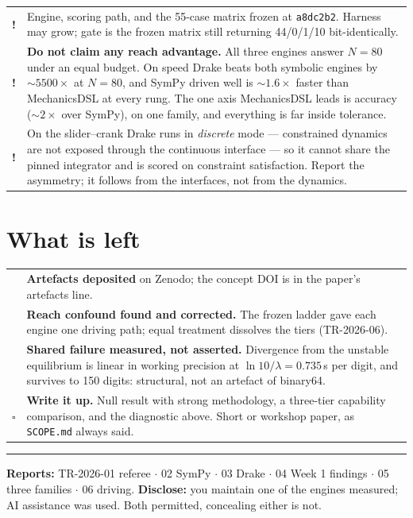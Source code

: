 \documentclass[10pt,a4paper]{article}
\newcommand{\done}{\textcolor{okgreen}{\textbf{\checkmark}}}
\newcommand{\todo}{\textcolor{nextblue}{$\square$}}
\begin{document}
\begin{tabular}{@{}cL{0.90\textwidth}@{}}
\textcolor{holdred}{\textbf{!}} & Engine, scoring path, and the 55-case matrix frozen at \texttt{a8dc2b2}. Harness may grow; gate is the frozen matrix still returning 44/0/1/10 bit-identically. \\
\textcolor{holdred}{\textbf{!}} & \textbf{Do not claim any reach advantage.} All three engines answer $N=80$ under an equal budget. On speed Drake beats both symbolic engines by ${\sim}5500\times$ at $N=80$, and SymPy driven well is ${\sim}1.6\times$ faster than MechanicsDSL at every rung. The one axis MechanicsDSL leads is accuracy (${\sim}2\times$ over SymPy), on one family, and everything is far inside tolerance. \\
\textcolor{holdred}{\textbf{!}} & On the slider--crank Drake runs in \emph{discrete} mode --- constrained dynamics are not exposed through the continuous interface --- so it cannot share the pinned integrator and is scored on constraint satisfaction. Report the asymmetry; it follows from the interfaces, not from the dynamics. \\
\end{tabular}

\section{What is left}

\begin{tabular}{@{}cL{0.90\textwidth}@{}}
\done & \textbf{Artefacts deposited} on Zenodo; the concept DOI is in the paper's artefacts line. \\
\done & \textbf{Reach confound found and corrected.} The frozen ladder gave each engine one driving path; equal treatment dissolves the tiers (TR-2026-06). \\
\done & \textbf{Shared failure measured, not asserted.} Divergence from the unstable equilibrium is linear in working precision at $\ln10/\lambda = 0.735$\,s per digit, and survives to 150 digits: structural, not an artefact of binary64. \\
\todo & \textbf{Write it up.} Null result with strong methodology, a three-tier capability comparison, and the diagnostic above. Short or workshop paper, as \texttt{SCOPE.md} always said. \\
\end{tabular}

\vspace{0.4em}
{\color{rulegrey}\hrule height 0.5pt}
\vspace{0.25em}
{\footnotesize \textbf{Reports:} TR-2026-01 referee $\cdot$ 02 SymPy $\cdot$ 03
Drake $\cdot$ 04 Week 1 findings $\cdot$ 05 three families $\cdot$ 06 driving. \quad
\textbf{Disclose:} you maintain one of the engines measured; AI assistance was
used. Both permitted, concealing either is not.}
\end{document}
